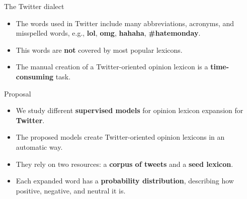 \documentclass[handout]{beamer}
\begin{document}
\begin{frame}{The Twitter dialect}
\begin{scriptsize}
\begin{itemize}
 \item The words used in Twitter include many abbreviations, acronyms, and misspelled words, e.g., \textbf{lol}, \textbf{omg}, \textbf{hahaha}, \textbf{\#hatemonday}.
\item This words are \textbf{not} covered by most popular lexicons.
\item The manual creation of a Twitter-oriented opinion lexicon is a \textbf{time-consuming} task.
\end{itemize}
\end{scriptsize}




\end{frame}





\begin{frame}{Proposal}
\begin{scriptsize}
\begin{itemize}
\item We study different \textbf{supervised models} for opinion lexicon expansion for  \textbf{Twitter}.
\item The proposed models create Twitter-oriented opinion lexicons in an automatic way.
\item They rely on two resources: a \textbf{corpus of tweets} and a \textbf{seed lexicon}.
\item Each expanded word has a \textbf{probability distribution}, describing how positive, negative, and neutral it is.
\end{itemize}
\end{scriptsize}
\end{frame}
\end{document}
